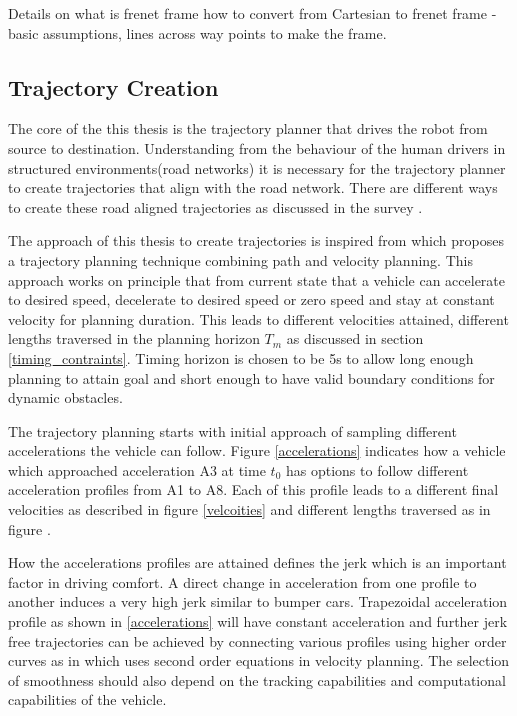 

Details on what is frenet frame
how to convert from Cartesian to frenet frame - basic assumptions, lines across way points to make the frame. 

\subsection{ Trajectory Creation} \label{traj_creation}

The core of the this thesis is the trajectory planner that drives the robot from source to destination. Understanding from the behaviour of the human drivers in structured environments(road networks) it is necessary for the trajectory planner to create trajectories that align with the road network. There are different ways to create these road aligned trajectories as discussed in the survey \cite{motion_planning_techniques}. 

The approach of this thesis to create trajectories is inspired from \cite{unit_A_star} which proposes a trajectory planning technique combining path and velocity planning. This approach works on principle that from current state that a vehicle can accelerate to desired speed, decelerate to desired speed or zero speed and stay at constant velocity for planning duration. This leads to different velocities attained, different lengths traversed in the planning horizon $ T_m $ as discussed in section \ref{timing_contraints}. Timing horizon is chosen to be 5s to allow long enough planning to attain goal and short enough to have valid boundary conditions for dynamic obstacles. 

The trajectory planning starts with initial approach of sampling different accelerations the vehicle can follow. Figure \ref{accelerations} indicates how a vehicle which approached acceleration A3 at time $t_0$ has options to follow different acceleration profiles from A1 to A8. Each of this profile leads to a different final velocities as described in figure \ref{velcoities} and different lengths traversed as in figure . 

How the accelerations profiles are attained defines the jerk which is an important factor in driving comfort. A direct change in acceleration from one profile to another induces a very high jerk similar to bumper cars. Trapezoidal acceleration profile as shown in \ref{accelerations} will have constant acceleration and further jerk free trajectories can be achieved by connecting various profiles using higher order curves as in \cite{diss_shui_phd_thesis} which uses second order equations in velocity planning. The selection of smoothness should also depend on the tracking capabilities and computational capabilities of the vehicle. 


